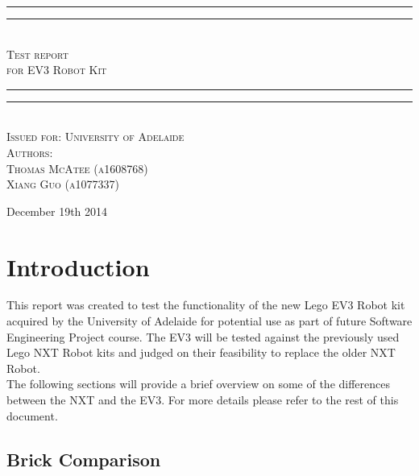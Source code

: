\documentclass[11pt, a4paper, oneside]{article}
\newlength{\drop}
\begin{document}
  \begin{titlepage}
    \textheight
    \centering
    \vspace*{\baselineskip}
    \rule{\textwidth}{1.6pt}\vspace*{-\baselineskip}\vspace*{2pt}
    \rule{\textwidth}{0.4pt}\\[\baselineskip]
    {\scshape \LARGE Test report \\[0.3\baselineskip] for EV3 Robot Kit}\\[0.2\baselineskip]
    \rule{\textwidth}{0.4pt}\vspace*{-\baselineskip}\vspace{3.2pt}
    \rule{\textwidth}{1.6pt}\\[\baselineskip]
    {\scshape Issued for:  University of Adelaide}\\[0.2\baselineskip]
    \vfill
    \scshape
    Authors: \\ Thomas McAtee (a1608768) \\ Xiang Guo (a1077337) \par
    \vspace*{2\baselineskip}

    {\large December 19th 2014}\par
      \thispagestyle{empty}

  	\end{titlepage}

  \thispagestyle{empty}
  \newpage


  \tableofcontents
  \thispagestyle{empty}
  \newpage
  \setcounter{page}{1}
  	\section{Introduction}
	This report was created to test the functionality of the new Lego EV3 Robot kit acquired by the University of Adelaide for potential use as part of future Software Engineering Project course. The EV3 will be tested against the previously used Lego NXT Robot kits and judged on their feasibility to replace the older NXT Robot.\\

	The following sections will provide a brief overview on some of the differences between the NXT and the EV3. For more details please refer to the rest of this document.

		\subsection{Brick Comparison}
\end{document}
